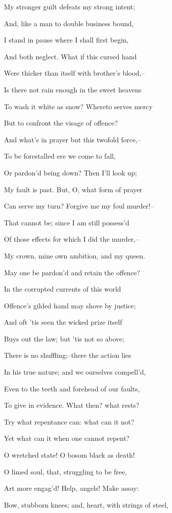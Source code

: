 \documentclass[12pt]{book}
\begin{document}
My stronger guilt defeats my strong intent;

And, like a man to double business bound,

I stand in pause where I shall first begin,

And both neglect. What if this cursed hand

Were thicker than itself with brother's blood,--

Is there not rain enough in the sweet heavens

To wash it white as snow? Whereto serves mercy

But to confront the visage of offence?

And what's in prayer but this twofold force,--

To be forestalled ere we come to fall,

Or pardon'd being down? Then I'll look up;

My fault is past. But, O, what form of prayer

Can serve my turn? Forgive me my foul murder!--

That cannot be; since I am still possess'd

Of those effects for which I did the murder,--

My crown, mine own ambition, and my queen.

May one be pardon'd and retain the offence?

In the corrupted currents of this world

Offence's gilded hand may shove by justice;

And oft 'tis seen the wicked prize itself

Buys out the law; but 'tis not so above;

There is no shuffling;--there the action lies

In his true nature; and we ourselves compell'd,

Even to the teeth and forehead of our faults,

To give in evidence. What then? what rests?

Try what repentance can: what can it not?

Yet what can it when one cannot repent?

O wretched state! O bosom black as death!

O limed soul, that, struggling to be free,

Art more engag'd! Help, angels! Make assay:

Bow, stubborn knees; and, heart, with strings of steel,
\end{document}
